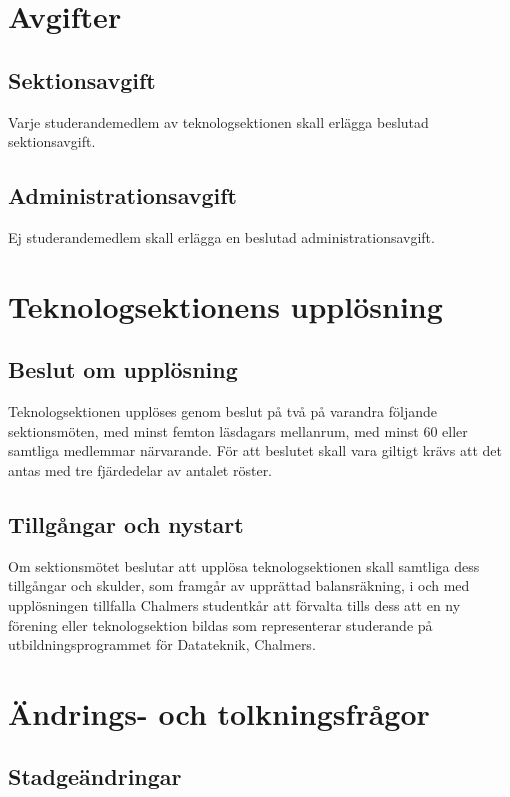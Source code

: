 \documentclass[a4paper, 10pt]{article}
\begin{document}
\section{Avgifter}
\subsection{Sektionsavgift}
Varje studerandemedlem av teknologsektionen skall erlägga beslutad sektionsavgift.
\subsection{Administrationsavgift}
Ej studerandemedlem skall erlägga en beslutad administrationsavgift.
\newpage

\section{Teknologsektionens upplösning}
\subsection{Beslut om upplösning}
Teknologsektionen upplöses genom beslut på två på varandra följande sektionsmöten, med minst femton läsdagars mellanrum, med minst 60 eller samtliga medlemmar närvarande. För att beslutet skall vara giltigt krävs att det antas med tre fjärdedelar av antalet röster.
\subsection{Tillgångar och nystart}
Om sektionsmötet beslutar att upplösa teknologsektionen skall samtliga dess tillgångar och skulder, som framgår av upprättad balansräkning, i och med upplösningen tillfalla Chalmers studentkår att förvalta tills dess att en ny förening eller teknologsektion bildas som representerar studerande på utbildningsprogrammet för Datateknik, Chalmers.
\newpage

\section{Ändrings- och tolkningsfrågor}
\subsection{Stadgeändringar}
\end{document}
